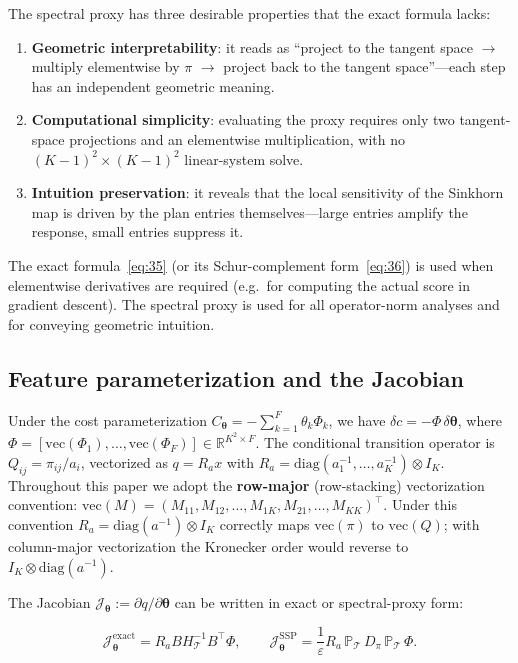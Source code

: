\documentclass[11pt,a4paper]{article}
\theoremstyle{remark}
\begin{document}
The spectral proxy has three desirable properties that the exact formula lacks:

\begin{enumerate}
\item \textbf{Geometric interpretability}: it reads as ``project to the tangent space $\to$
multiply elementwise by $\pi$ $\to$ project back to the tangent space''---each step has an
independent geometric meaning.
\item \textbf{Computational simplicity}: evaluating the proxy requires only two tangent-space
projections and an elementwise multiplication, with no $(K-1)^2\times(K-1)^2$ linear-system
solve.
\item \textbf{Intuition preservation}: it reveals that the local sensitivity of the Sinkhorn
map is driven by the plan entries themselves---large entries amplify the response, small
entries suppress it.
\end{enumerate}

The exact formula~\eqref{eq:35} (or its Schur-complement form~\eqref{eq:36}) is used when
elementwise derivatives are required (e.g.\ for computing the actual score in gradient
descent). The spectral proxy is used for all operator-norm analyses and for conveying
geometric intuition.

\subsection{Feature parameterization and the Jacobian}

Under the cost parameterization $C_{\bm{\theta}}=-\sum_{k=1}^F\theta_k\Phi_k$, we have
$\delta c=-\Phi\,\delta\bm{\theta}$, where
$\Phi=[\mathrm{vec}(\Phi_1),\dots,\mathrm{vec}(\Phi_F)]\in\mathbb{R}^{K^2\times F}$. The
conditional transition operator is $Q_{ij}=\pi_{ij}/a_i$, vectorized as $q=R_a x$ with
$R_a=\mathrm{diag}(a_1^{-1},\dots,a_K^{-1})\otimes I_K$. Throughout this paper we adopt the
\textbf{row-major} (row-stacking) vectorization convention:
$\mathrm{vec}(M)=(M_{11},M_{12},\dots,M_{1K},M_{21},\dots,M_{KK})^{\top}$. Under this
convention $R_a=\mathrm{diag}(a^{-1})\otimes I_K$ correctly maps $\mathrm{vec}(\pi)$ to
$\mathrm{vec}(Q)$; with column-major vectorization the Kronecker order would reverse to
$I_K\otimes\mathrm{diag}(a^{-1})$.

The Jacobian $\mathcal{J}_{\bm{\theta}}:=\partial q/\partial\bm{\theta}$ can be written in
exact or spectral-proxy form:

\[
\mathcal{J}_{\bm{\theta}}^{\text{exact}} = R_a B H_{\mathcal{T}}^{-1} B^{\top}\Phi,\qquad
\mathcal{J}_{\bm{\theta}}^{\text{SSP}} = \frac{1}{\varepsilon}R_a\,\mathbb{P}_{\mathcal{T}}\,D_\pi\,\mathbb{P}_{\mathcal{T}}\,\Phi.
\]
\end{document}
